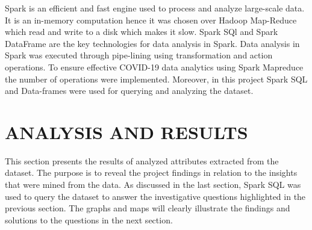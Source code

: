 \documentclass[12pt]{article}
\begin{document}
Spark is an efficient and fast engine used to process and analyze large-scale data. It is an in-memory computation hence it was chosen over Hadoop Map-Reduce which read  and write to a disk which makes it slow. Spark SQl and Spark DataFrame are the key technologies for data analysis in Spark. Data analysis in Spark was  executed through pipe-lining using transformation and action operations. To ensure effective COVID-19 data analytics using Spark Mapreduce the number of operations were implemented. Moreover, in this project Spark SQL and Data-frames were used for querying  and analyzing the dataset. 

\section{ANALYSIS AND RESULTS}

This section presents the results of analyzed attributes extracted from the dataset. The purpose is to reveal the project findings  in relation to the insights that were mined from the data. As discussed in the last section, Spark SQL was used to query the dataset to answer the  investigative questions highlighted in the previous section. The graphs and maps will clearly illustrate the findings and solutions to the  questions in the next section.  
\end{document}
